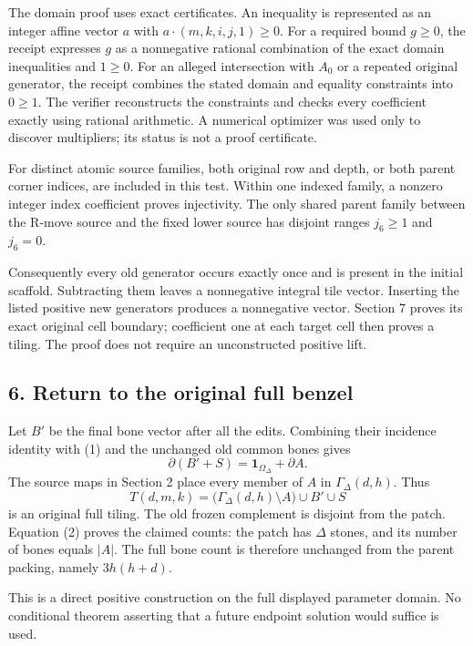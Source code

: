 The domain proof uses exact certificates. An inequality is represented
as an integer affine vector \(a\) with \(a\cdot(m,k,i,j,1)\ge0\). For a
required bound \(g\ge0\), the receipt expresses \(g\) as a nonnegative
rational combination of the exact domain inequalities and \(1\ge0\). For
an alleged intersection with \(A_0\) or a repeated original generator,
the receipt combines the stated domain and equality constraints into
\(0\ge1\). The verifier reconstructs the constraints and checks every
coefficient exactly using rational arithmetic. A numerical optimizer was
used only to discover multipliers; its status is not a proof
certificate.

For distinct atomic source families, both original row and depth, or
both parent corner indices, are included in this test. Within one
indexed family, a nonzero integer index coefficient proves injectivity.
The only shared parent family between the R-move source and the fixed
lower source has disjoint ranges \(j_6\ge1\) and \(j_6=0\).

Consequently every old generator occurs exactly once and is present in
the initial scaffold. Subtracting them leaves a nonnegative integral
tile vector. Inserting the listed positive new generators produces a
nonnegative vector. Section 7 proves its exact original cell boundary;
coefficient one at each target cell then proves a tiling. The proof does
not require an unconstructed positive lift.

\subsection{6. Return to the original full
benzel}\label{return-to-the-original-full-benzel}

Let \(B'\) be the final bone vector after all the edits. Combining their
incidence identity with (1) and the unchanged old common bones gives \[
\partial(B'+S)=\mathbf1_{\Omega_\Delta}+\partial A.\tag{2}
\] The source maps in Section 2 place every member of \(A\) in
\(\Gamma_\Delta(d,h)\). Thus \[
T(d,m,k)=\bigl(\Gamma_\Delta(d,h)\setminus A\bigr)\cup B'\cup S
\] is an original full tiling. The old frozen complement is disjoint
from the patch. Equation (2) proves the claimed counts: the patch has
\(\Delta\) stones, and its number of bones equals \(|A|\). The full bone
count is therefore unchanged from the parent packing, namely
\(3h(h+d)\).

This is a direct positive construction on the full displayed parameter
domain. No conditional theorem asserting that a future endpoint solution
would suffice is used.

